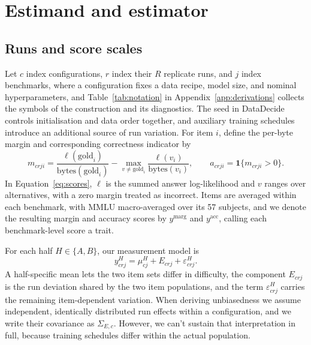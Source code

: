 \documentclass{article}
\begin{document}
\section{Estimand and estimator}
\label{sec:estimator}
\subsection{Runs and score scales}
Let $c$ index configurations, $r$ index their $R$ replicate runs, and $j$ index benchmarks, where a configuration fixes a data recipe, model size, and nominal hyperparameters, and Table~\ref{tab:notation} in Appendix~\ref{app:derivations} collects the symbols of the construction and its diagnostics. The seed in DataDecide controls initialisation and data order together, and auxiliary training schedules introduce an additional source of run variation. For item $i$, define the per-byte margin and corresponding correctness indicator by
\begin{equation}
m_{crji}=\frac{\ell(\mathrm{gold}_i)}{\mathrm{bytes}(\mathrm{gold}_i)}-
\max_{v\ne\mathrm{gold}_i}\frac{\ell(v_i)}{\mathrm{bytes}(v_i)},
\qquad a_{crji}=\mathbf{1}\{m_{crji}>0\}.
\label{eq:scores}
\end{equation}
In Equation~\ref{eq:scores}, $\ell$ is the summed answer log-likelihood and $v$ ranges over alternatives, with a zero margin treated as incorrect. Items are averaged within each benchmark, with MMLU macro-averaged over its 57 subjects, and we denote the resulting margin and accuracy scores by $y^{\mathrm{marg}}$ and $y^{\mathrm{acc}}$, calling each benchmark-level score a trait.

For each half $H\in\{A,B\}$, our measurement model is
\begin{equation}
y^H_{crj}=\mu^H_{cj}+E_{crj}+\varepsilon^H_{crj}.
\end{equation}
A half-specific mean lets the two item sets differ in difficulty, the component $E_{crj}$ is the run deviation shared by the two item populations, and the term $\varepsilon^H_{crj}$ carries the remaining item-dependent variation. When deriving unbiasedness we assume independent, identically distributed run effects within a configuration, and we write their covariance as $\Sigma_{E,c}$. However, we can't sustain that interpretation in full, because training schedules differ within the actual population.
\end{document}
